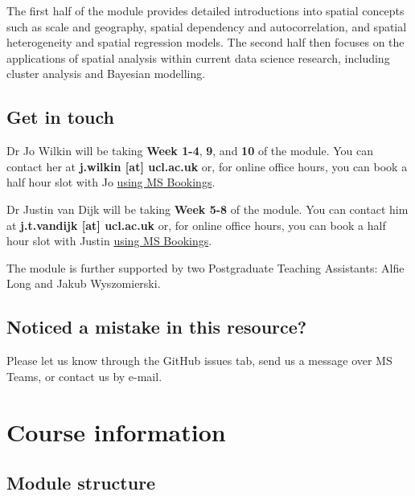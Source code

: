 \documentclass[
]{book}
\begin{document}
The first half of the module provides detailed introductions into spatial concepts such as scale and geography,
spatial dependency and autocorrelation, and spatial heterogeneity and spatial regression models. The second half then focuses
on the applications of spatial analysis within current data science research, including cluster analysis and Bayesian modelling.

\hypertarget{get-in-touch}{%
\section*{Get in touch}\label{get-in-touch}}

Dr Jo Wilkin will be taking \textbf{Week 1-4}, \textbf{9}, and \textbf{10} of the module. You can contact her at \textbf{j.wilkin {[}at{]} ucl.ac.uk} or, for online office hours, you can book a half hour slot with Jo \href{https://outlook.office365.com/owa/calendar/JoWilkinBookableOfficeHours@ucl.ac.uk/bookings/}{using MS Bookings}.

Dr Justin van Dijk will be taking \textbf{Week 5-8} of the module. You can contact him at \textbf{j.t.vandijk {[}at{]} ucl.ac.uk} or, for online office hours, you can book a half hour slot with Justin \href{https://outlook.office365.com/owa/calendar/JustinvanDijkBookableOfficeHours@ucl.ac.uk/bookings/s/z5HqD80lWU-RMPggKx0acQ2}{using MS Bookings}.

The module is further supported by two Postgraduate Teaching Assistants: Alfie Long and Jakub Wyszomierski.

\hypertarget{noticed-a-mistake-in-this-resource}{%
\section*{Noticed a mistake in this resource?}\label{noticed-a-mistake-in-this-resource}}

Please let us know through the GitHub issues tab, send us a message over MS Teams, or contact us by e-mail.

\hypertarget{course-information}{%
\chapter*{Course information}\label{course-information}}

\hypertarget{module-structure}{%
\section*{Module structure}\label{module-structure}}
\end{document}
